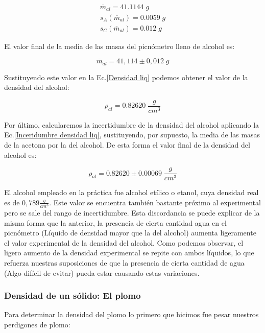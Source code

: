 \documentclass[a4paper,12pt,titlepage]{article}
\begin{document}
\begin{gather}
    \overline{m}_{al} = 41.1144 \; g\\
    s_{A}(\overline{m}_{al}) = 0.0059 \; g\\
    s_{C}(\overline{m}_{al}) = 0.012 \; g
\end{gather}

El valor final de la media de las masas del picnómetro lleno de alcohol es:

\begin{equation}
    \overline{m}_{al} = 41,114 \pm 0,012 \; g
\end{equation}

Sustituyendo este valor en la Ec.\ref{Densidad liq} podemos obtener el valor de la densidad del alcohol:

\begin{equation}
    \rho_{al}  = 0.82620 \; \frac{g}{cm^3}
\end{equation}

Por último, calcularemos la incertidumbre de la densidad del alcohol aplicando la Ec.\ref{Inceridumbre densidad liq}, sustituyendo, por supuesto, la media de las masas de la acetona por la del alcohol. De esta forma el valor final de la densidad del alcohol es:

\begin{equation}
    \rho_{al} = 0.82620 \pm 0.00069 \; \frac{g}{cm^3}
\end{equation}

El alcohol empleado en la práctica fue alcohol etílico o etanol, cuya densidad real es de $0,789 \frac{g}{cm^3}$. Este valor se encuentra también bastante próximo al experimental pero se sale del rango de incertidumbre. Esta discordancia se puede explicar de la misma forma que la anterior, la presencia de cierta cantidad agua en el picnómetro (Líquido de densidad mayor que la del alcohol) aumenta ligeramente el valor experimental de la densidad del alcohol. Como podemos observar, el ligero aumento de la densidad experimental se repite con ambos líquidos, lo que refuerza nuestras suposiciones de que la presencia de cierta cantidad de agua (Algo difícil de evitar) pueda estar causando estas variaciones.


\newpage

\subsubsection{Densidad de un sólido: El plomo}

Para determinar la densidad del plomo lo primero que hicimos fue pesar nuestros perdigones de plomo:
\end{document}

